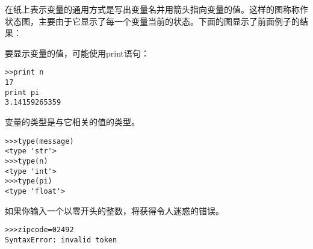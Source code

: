 在纸上表示变量的通用方式是写出变量名并用箭头指向变量的值。这样的图称称作状态图，主要由于它显示了每一个变量当前的状态。下面的图显示了前面例子的结果：

要显示变量的值，可能使用print语句：
\begin{lstlisting}
>>print n
17
print pi
3.14159265359
\end{lstlisting}
变量的类型是与它相关的值的类型。
\begin{lstlisting}
>>>type(message)
<type 'str'>
>>>type(n)
<type 'int'>
>>>type(pi)
<type 'float'>
\end{lstlisting}

\begin{exercise}
	如果你输入一个以零开头的整数，将获得令人迷惑的错误。
\end{exercise}

\begin{lstlisting}
>>>zipcode=02492
SyntaxError: invalid token
\end{lstlisting}
\endinput